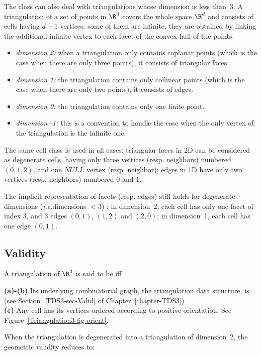 The class  can also deal with
triangulations whose dimension is less than~3. A triangulation of a
set of points in $\R^d$ covers the whole space $\R^d$ and consists of
cells having $d+1$ vertices: some of them are infinite, they are
obtained by linking the additional infinite vertex to each facet of
the convex hull of the points.
\begin{itemize}
\item {} \emph{dimension 2:} when a triangulation only contains
coplanar points (which is the case when there are only three points), 
it consists of triangular faces.
\item {} \emph{dimension 1:} the triangulation contains only collinear 
points (which is the case when there are only two points), it consists
of edges.
\item {} \emph{dimension 0:} the triangulation contains only one
finite point.
\item {} \emph{dimension -1:} this is a convention to handle the case
when the only vertex of the triangulation is the infinite one.
\end{itemize} 

The same cell class is used in all cases: triangular faces in
2D can be considered as degenerate cells, having only three vertices
(resp. neighbors)
numbered $(0,1,2)$, and one $NULL$ vertex (resp. neighbor);
edges in 1D have only two vertices (resp. neighbors) numbered $0$ and $1$. 

The implicit representation of facets (resp. edges) still holds
for degenerate dimensions (\textit{i.e.}dimensions $<3$) : in
dimension~2, each cell has only one facet of index 3, and 3 edges
$(0,1)$, $(1,2)$ and $(2,0)$; in dimension~1, each cell has one edge
$(0,1)$.  

\subsection{Validity}
\label{Triangulation3-sec-Valid}

A triangulation of $\R^3$ is said to be  iff

{\bf (a)-(b)} Its underlying combinatorial graph, the triangulation
data structure, is  
(see Section~\ref{TDS3-sec-Valid} of Chapter~\ref{chapter-TDS3})\\
{\bf (c)} Any cell has its vertices ordered according to positive
orientation. See Figure~\ref{Triangulation3-fig-orient}.

When the triangulation is degenerated into a triangulation of
dimension~2, the  geometric validity reduces to:

